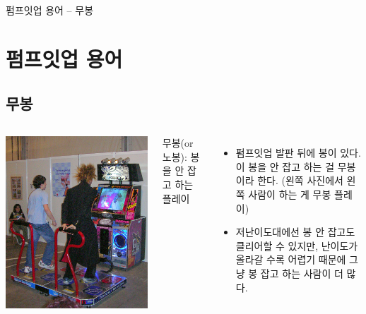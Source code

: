 \documentclass{beamer}
\begin{document}
\begin{frame}{펌프잇업 용어 -- 무봉}
	\section{펌프잇업 용어}
	\subsection{무봉}

	\begin{columns}
		\includegraphics[width=\columnwidth]{piu-bong.jpg}

		무봉(or 노봉): 봉을 안 잡고 하는 플레이
		\begin{itemize}
			\item 펌프잇업 발판 뒤에 봉이 있다. 이 봉을 안 잡고 하는 걸 무봉이라 한다. (왼쪽 사진에서 왼쪽 사람이 하는 게 무봉 플레이)
			\item 저난이도대에선 봉 안 잡고도 클리어할 수 있지만, 난이도가 올라갈 수록 어렵기 때문에 그냥 봉 잡고 하는 사람이 더 많다.
		\end{itemize}
	\end{columns}
\end{frame}
\end{document}
